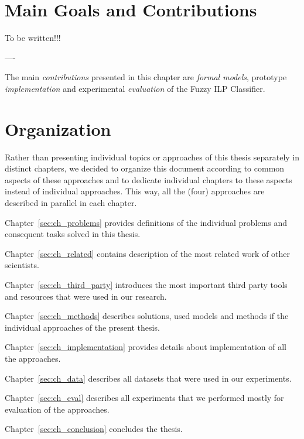 \section{Main Goals and Contributions}

To be written!!!

----

The main \emph{contributions} presented in this chapter are \emph{formal models}, prototype \emph{implementation} and experimental \emph{evaluation} of the Fuzzy ILP Classifier.



\section{Organization}

Rather than presenting individual topics or approaches of this thesis separately in distinct chapters, we decided to organize this document according to common aspects of these approaches and to dedicate individual chapters to these aspects instead of individual approaches. This way, all the (four) approaches are described in parallel in each chapter. 

Chapter~\ref{sec:ch_problems} provides definitions of the individual problems and consequent tasks solved in this thesis.

Chapter~\ref{sec:ch_related} contains description of the most related work of other scientists.

Chapter~\ref{sec:ch_third_party} introduces the most important third party tools and resources that were used in our research.

Chapter~\ref{sec:ch_methods} describes solutions, used models and methods if the individual approaches of the present thesis.

Chapter~\ref{sec:ch_implementation} provides details about implementation of all the approaches.

Chapter~\ref{sec:ch_data} describes all datasets that were used in our experiments.

Chapter~\ref{sec:ch_eval} describes all experiments that we performed mostly for evaluation of the approaches.

Chapter~\ref{sec:ch_conclusion} concludes the thesis.

